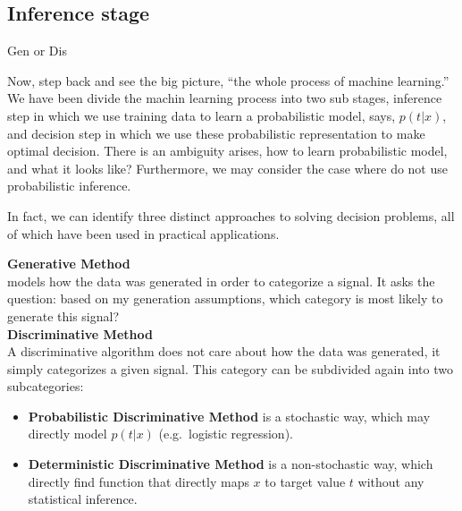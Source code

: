 \documentclass{bredelebeamer}
\begin{document}
\subsection{Inference stage}
\begin{frame}{Gen or Dis}
  \begin{justify}
    Now, step back and see the big picture, ``the whole process of machine learning.''
    We have been divide the machin learning process into two sub stages, inference
    step in which we use training data to learn a probabilistic model, says, $p(t|x)$,
    and decision step in which we use these probabilistic representation to make
    optimal decision. There is an ambiguity arises, how to learn probabilistic
    model, and what it looks like? Furthermore, we may consider the case where
    do not use probabilistic inference.

    In fact, we can identify three distinct approaches to solving decision problems,
    all of which have been used in practical applications.

    \vspace{0.5\baselineskip}
    \textbf{Generative Method}\\
    models how the data was generated in order to categorize a signal. It asks
    the question: based on my generation assumptions, which category is most
    likely to generate this signal?\\

    \vspace{0.5\baselineskip}
    \textbf{Discriminative Method}\\
    A discriminative algorithm does not care about how the data was generated,
    it simply categorizes a given signal. This category can be subdivided again
    into two subcategories:\\

    \begin{itemize}
      \item\begin{justify}
        \textbf{Probabilistic Discriminative Method} is a stochastic way,
        which may directly model $p(t|x)$ (e.g.\ logistic regression).
      \end{justify}
      \item\begin{justify}
        \textbf{Deterministic Discriminative Method} is a non-stochastic way,
        which directly find function that directly maps $x$ to target value $t$
        without any statistical inference.
      \end{justify}
    \end{itemize}
  \end{justify}
\end{frame}
\end{document}
